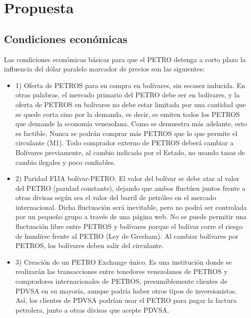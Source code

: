 %
\section{Propuesta}
\label{sec:proposal}
%
\subsection{Condiciones económicas}
\label{sec:overview}
%
Las condiciones económicas básicas para que el PETRO detenga a corto plazo la influencia del dólar paralelo marcador de precios son las siguientes:
\begin{itemize}
\item{1)} Oferta de PETROS para su compra en bolívares, sin escasez inducida. En otras palabras, el mercado primario del PETRO debe ser en bolívares, y la oferta de PETROS en bolívares no debe estar limitada por una cantidad que se quede corta sino por la demanda, es decir, se emiten todos los PETROS que demande la economía venezolana. Como se demuestra más adelante,  esto es factible, Nunca se podrán comprar más PETROS que lo que permite el circulante (M1). Todo comprador externo de PETROS deberá cambiar a Bolívares previamente, al cambio indicado por el Estado, no usando tasas de cambio ilegales y poco confiables.
%
\item{2)} Paridad FIJA bolívar-PETRO. El valor del bolívar se debe atar al valor del PETRO (paridad constante), dejando que ambos fluctúen juntos frente a otras divisas según sea el valor del barril de petróleo en el mercado internacional. Dicha fluctuación será inevitable, pero no podrá ser controlada por un pequeño grupo a través de una página web. No se puede permitir una fluctuación libre entre PETROS y bolívares porque el bolívar corre el riesgo de hundirse frente al PETRO (Ley de Gresham). Al cambiar bolívares por PETROS, los bolívares deben salir del circulante.
%   
\item{3)} Creación de un PETRO Exchange único. Es una institución donde se realizarán las transacciones entre tenedores venezolanos de PETROS y compradores internacionales de PETROS, presumiblemente clientes de PDVSA en su mayoría, aunque podría haber otros tipos de inversionistas. Así, los clientes de PDVSA podrían usar el PETRO para pagar la factura petrolera, junto a otras divisas que acepte PDVSA.
\end{itemize}
